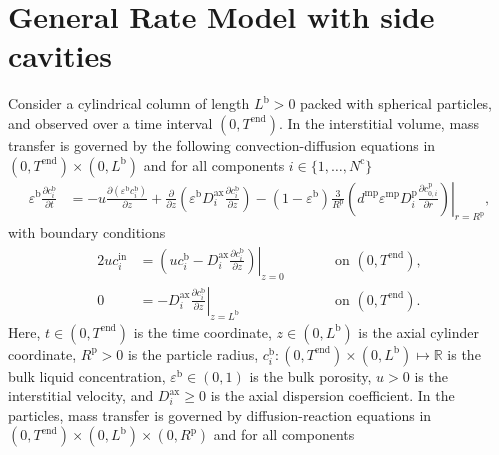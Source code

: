 \documentclass{article}
\begin{document}
\section*{General Rate Model with side cavities}
Consider a cylindrical column of length $L^{\mathrm{b}} > 0$ packed with spherical particles, and observed over a time interval $(0, T^{\mathrm{end}})$.
In the interstitial volume, mass transfer is governed by the following convection-diffusion equations in $(0, T^{\mathrm{end}})\times (0, L^{\mathrm{b}})$ and for all components $i\in\{1, \dots, N^{\mathrm{c}} \}$
\begin{align}
    \varepsilon^{\mathrm{b}} \frac{\partial c^{\mathrm{b}}_{i}}{\partial t}
    &= - u \frac{\partial \left( \varepsilon^{\mathrm{b}} c^{\mathrm{b}}_{i} \right)}{\partial z}
        + \frac{\partial}{\partial z} \left( \varepsilon^{\mathrm{b}} D^{\mathrm{ax}}_{i} \frac{\partial c^{\mathrm{b}}_{i}}{\partial z} \right)
        - \left(1 - \varepsilon^{\mathrm{b}} \right) \frac{3}{R^{\mathrm{p}}} \left( d^{\mathrm{mp}} \varepsilon^{\mathrm{mp}} D^{\mathrm{p}}_{i} \left. \frac{\partial c^{\mathrm{p}}_{0,i}}{\partial r}\right)\right|_{r = R^{\mathrm{p}}},
\end{align}
with boundary conditions
\begin{alignat}{2}
    u c^{\mathrm{in}}_{i}
    &= \left.\left( u c^{\mathrm{b}}_{i} - D^{\mathrm{ax}}_{i} \frac{\partial c^{\mathrm{b}}_{i}}{\partial z}\right)\right|_{z=0}
    & & \qquad\text{on }(0, T^{\mathrm{end}}),
    \\
    0
    &= - D^{\mathrm{ax}}_{i} \left. \frac{\partial c^{\mathrm{b}}_{i}}{\partial z} \right|_{z=L^{\mathrm{b}}}
    & & \qquad\text{on }(0, T^{\mathrm{end}}).
\end{alignat}
Here, $t\in (0, T^{\mathrm{end}})$ is the time coordinate, $z\in (0, L^{\mathrm{b}})$ is the axial cylinder coordinate, $R^{\mathrm{p}}> 0$ is the particle radius, $c^{\mathrm{b}}_{i}\colon (0, T^{\mathrm{end}})\times (0, L^{\mathrm{b}}) \mapsto \mathbb{R}$ is the bulk liquid concentration, $\varepsilon^{\mathrm{b}}\in (0, 1)$ is the bulk porosity, $u> 0$ is the interstitial velocity, and $D^{\mathrm{ax}}_{i}\geq 0$ is the axial dispersion coefficient.
In the particles, mass transfer is governed by diffusion-reaction equations in $(0, T^{\mathrm{end}}) \times (0, L^{\mathrm{b}})\times (0, R^{\mathrm{p}})$ and for all components
\end{document}
